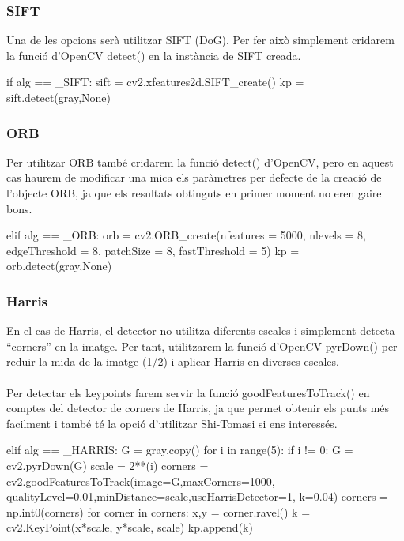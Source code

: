		\subsubsection{SIFT}
		Una de les opcions serà utilitzar SIFT (DoG). Per fer això simplement cridarem la funció d'OpenCV detect() en la instància de SIFT creada.\\
		\begin{python}
	if alg == _SIFT:
		sift = cv2.xfeatures2d.SIFT_create()
		kp = sift.detect(gray,None)
		\end{python}

		\subsubsection{ORB}
		Per utilitzar ORB també cridarem la funció detect() d'OpenCV, pero en aquest cas haurem de modificar una mica els paràmetres per defecte de la creació de l'objecte ORB, ja que els resultats obtinguts
		en primer moment no eren gaire bons.\\
		\begin{python}
	elif alg == _ORB:
		orb = cv2.ORB_create(nfeatures = 5000, nlevels = 8, edgeThreshold = 8,
		 patchSize = 8, fastThreshold = 5)
		kp = orb.detect(gray,None)
		\end{python}
\newpage
		\subsubsection{Harris}
		En el cas de Harris, el detector no utilitza diferents escales i simplement detecta ``corners'' en la imatge. Per tant, utilitzarem la funció d'OpenCV pyrDown() per reduir
		la mida de la imatge (1/2) i aplicar Harris en diverses escales.\\\\
		Per detectar els keypoints farem servir la funció goodFeaturesToTrack() en comptes del detector de corners de Harris, ja que permet obtenir els punts més facilment i
		també té la opció d'utilitzar Shi-Tomasi si ens interessés.\\
		\begin{python}
	elif alg == _HARRIS:
		G = gray.copy()
		for i in range(5):
			if i != 0:
				G = cv2.pyrDown(G)
			scale = 2**(i)
			corners = cv2.goodFeaturesToTrack(image=G,maxCorners=1000,
				qualityLevel=0.01,minDistance=scale,useHarrisDetector=1, k=0.04)
			corners = np.int0(corners)
			for corner in corners:
				x,y = corner.ravel()
				k = cv2.KeyPoint(x*scale, y*scale, scale)
				kp.append(k)
		\end{python}

